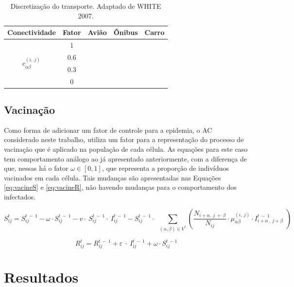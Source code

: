 \documentclass[a4paper,12pt]{article}
\newcommand{\cmark}{\ding{51}}%
\newcommand{\xmark}{\ding{55}}%
\begin{document}
\begin{table}[ht]
 \caption{Discretização do transporte. Adaptado de WHITE 2007\cite{White2007}.}
 \centering
 \begin{tabular}{c|c|c|c|c}
  Conectividade & Fator & Avião & Ônibus & Carro \\
  \hline
  \multirow{4}{*}{$c_{\alpha \beta}^{\left(i,\:j\right)}$} & 1 & \cmark & \cmark & \cmark \\
  & 0.6 & \xmark & \cmark & \cmark \\
  & 0.3 & \xmark & \xmark & \cmark \\
  & 0   & \xmark & \xmark & \xmark \\
\end{tabular}
\label{tab:movimentacao}
\end{table}

\subsection{Vacinação}

Como forma de adicionar um fator de controle para a epidemia, o AC considerado neste trabalho, utiliza um fator para a representação do processo de vacinação que é aplicado na população de cada célula. As equações para este caso tem comportamento análogo ao já apresentado anteriormente, com a diferença de que, nessas há o fator $\omega \in [0, 1]$, que representa a proporção de indivíduos vacinados em cada célula. Tais mudanças são apresentadas nas Equações \ref{eq:vacineS} e \ref{eq:vacineR}, não havendo mudanças para o comportamento dos infectados.

\begin{equation} 
S_{ij}^t=S_{ij}^{t\:-\:1}-\omega \cdot S_{ij}^{t\:-\:1}-v\cdot \:S_{ij}^{t\:-\:1}\cdot \:I_{ij}^{t\:-\:1}-S_{ij}^{t\:-\:1}\cdot \:\displaystyle \:\sum _{\left(\alpha ,\beta \right)\in V^{\ast }}^{ }\left(\frac{N_{i+\alpha ,\:j\:+\:\beta }}{N_{ij}}\cdot \mu _{\alpha \beta }^{\left(i,\:j\right)}\cdot I_{i+\alpha \:,\:j+\beta \:}^{t\:-\:1}\:\right)
\label{eq:vacineS}
\end{equation}

\begin{equation} 
R_{ij}^t=R_{ij}^{t\:-\:1}+\varepsilon \:\cdot \:I_{ij}^{t\:-\:1}+\omega \cdot S_{ij}^{t\:-1}
\label{eq:vacineR}
\end{equation}

\section{Resultados}
\end{document}
